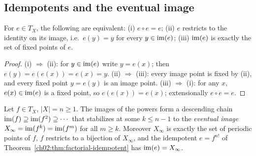 \subsection{Idempotents and the eventual image}

\begin{proposition}\label{ch02:prop:idempotent-char}
For $e \in T_X$, the following are equivalent: (i) $e \circ e = e$;
(ii) $e$ restricts to the identity on its image, i.e.\ $e(y) = y$ for
every $y \in \mathrm{im}(e)$; (iii) $\mathrm{im}(e)$ is exactly the set of fixed points
of $e$.
\end{proposition}

\begin{proof}
(i) $\Rightarrow$ (ii): for $y \in \mathrm{im}(e)$ write $y = e(x)$; then
$e(y) = e(e(x)) = e(x) = y$. (ii) $\Rightarrow$ (iii): every image point
is fixed by (ii), and every fixed point $y = e(y)$ is an image point.
(iii) $\Rightarrow$ (i): for any $x$, $e(x) \in \mathrm{im}(e)$ is a fixed
point, so $e(e(x)) = e(x)$; extensionally $e \circ e = e$.
\end{proof}

\begin{proposition}\label{ch02:prop:eventual-image}
Let $f \in T_X$, $|X| = n \geq 1$. The images of the powers form a
descending chain $\mathrm{im}(f) \supseteq \mathrm{im}(f^2) \supseteq \cdots$ that
stabilizes at some $k \leq n - 1$ to the \emph{eventual image}
$X_\infty = \mathrm{im}(f^{k}) = \mathrm{im}(f^{m})$ for all $m \geq k$. Moreover
$X_\infty$ is exactly the set of periodic points of $f$, $f$ restricts to
a bijection of $X_\infty$, and the idempotent $e = f^{n!}$ of
Theorem~\ref{ch02:thm:factorial-idempotent} has $\mathrm{im}(e) = X_\infty$.
\end{proposition}


